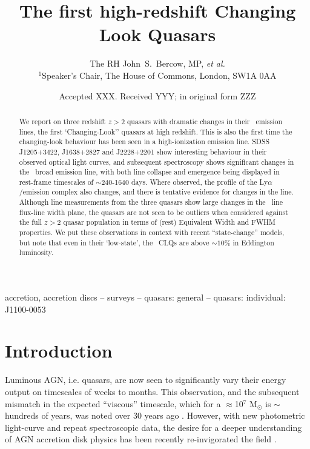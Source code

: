 \documentclass[a4paper,fleqn,usenatbib]{mnras}
\title[High-redshift CLQs]{The first high-redshift Changing Look Quasars}
\author[Bercow]
{The RH John~S.~Bercow, MP, {\it et al.} 
\\
$^{1}$Speaker's Chair, The House of Commons, London, SW1A 0AA \\
}
\date{Accepted XXX. Received YYY; in original form ZZZ}
\begin{document}
\label{firstpage}
\pagerange{\pageref{firstpage}--\pageref{lastpage}}
\maketitle

\begin{abstract}
We report on three redshift $z>2$ quasars with dramatic changes in
their \civ\ emission lines, the first `Changing-Look'' quasars at high
redshift.  This is also the first time the changing-look behaviour has
been seen in a high-ionization emission line.
SDSS J1205+3422, J1638+2827 and J2228+2201 show interesting behaviour
in their observed optical light curves, and subsequent spectroscopy
shows significant changes in the \civ\ broad emission line, with both
line collapse and emergence being displayed in rest-frame timescales
of $\sim$240-1640 days.
Where observed, the profile of the Ly$\alpha$/\nv emission complex
also changes, and there is tentative evidence for changes in the \mgii
line.
Although line measurements from the three quasars show large changes
in the \civ\ line flux-line width plane, the quasars are not seen to
be outliers when considered against the full $z>2$ quasar population
in terms of (rest) Equivalent Width and FWHM properties.
We put these observations in context with recent ``state-change''
models, but note that even in their `low-state', the \civ\ CLQs are
above $\sim10\%$ in Eddington luminosity.
\end{abstract}



\begin{keywords}
accretion, accretion discs -- surveys -- quasars: general -- quasars: individual: J1100-0053 
\end{keywords}



\section{Introduction}
Luminous AGN, i.e. quasars, are now seen to significantly vary their
energy output on timescales of weeks to months.  This observation, and
the subsequent mismatch in the expected ``viscous'' timescale, which
for a $\approx$10$^{7}$ M$_{\odot}$ is $\sim$hundreds of years, was
noted over 30 years ago \citep[e.g.][]{Alloin1985}. However, with new
photometric light-curve and repeat spectroscopic data, the desire for
a deeper understanding of AGN accretion disk physics has been recently
re-invigorated the field \citep[e.g.][]{Lawrence2018, Antonucci2018}.
\end{document}
